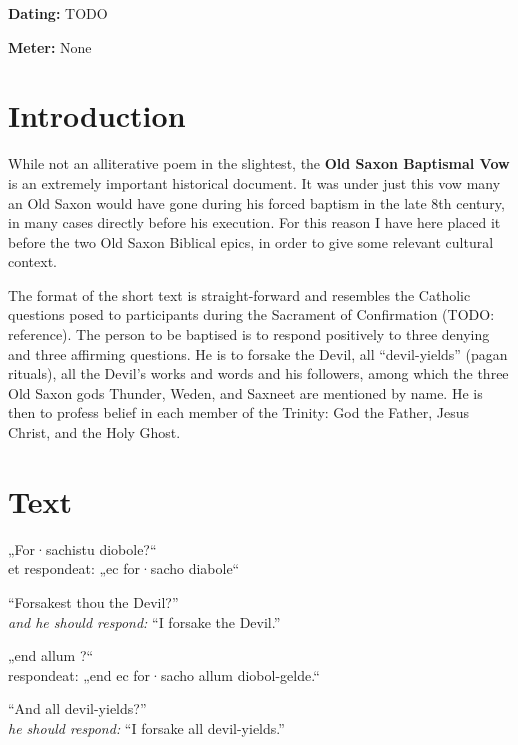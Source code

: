 
\begin{flushright}%
\textbf{Dating:} TODO

\textbf{Meter:} None
\end{flushright}%

\section{Introduction}

While not an alliterative poem in the slightest, the \textbf{Old Saxon Baptismal Vow} is an extremely important historical document.  It was under just this vow many an Old Saxon would have gone during his forced baptism in the late 8th century, in many cases directly before his execution.  For this reason I have here placed it before the two Old Saxon Biblical epics, in order to give some relevant cultural context.

The format of the short text is straight-forward and resembles the Catholic questions posed to participants during the Sacrament of Confirmation (TODO: reference).  The person to be baptised is to respond positively to three denying and three affirming questions.  He is to forsake the Devil, all “devil-yields” (pagan rituals), all the Devil’s works and words and his followers, among which the three Old Saxon gods Thunder, Weden, and Saxneet are mentioned by name.  He is then to profess belief in each member of the Trinity: God the Father, Jesus Christ, and the Holy Ghost.

\sectionline

\newpage

\section{Text}

\bpg\bpa%
„For·sachistu diobole?“ \\
et respondeat: „ec for·sacho diabole“\epa

\bpb “Forsakest thou the Devil?” \\
\emph{and he should respond:} “I forsake the Devil.”\epb\epg


\bpg\bpa%
„end allum ?“ \\
respondeat: „end ec for·sacho allum diobol-gelde.“\epa

\bpb “And all devil-yields?” \\
\emph{he should respond:} “I forsake all devil-yields.”\epb\epg


